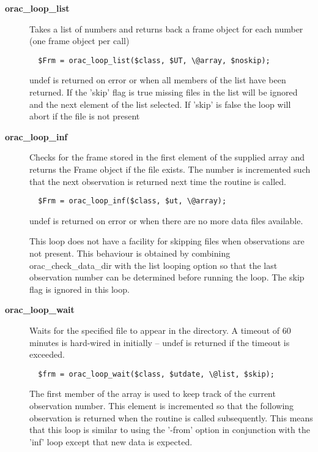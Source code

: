 \begin{description}
\item[\textbf{orac\_loop\_list}] \mbox{}

Takes a list of numbers and returns back a frame object 
for each number (one frame object per call)

\begin{verbatim}
  $Frm = orac_loop_list($class, $UT, \@array, $noskip);
\end{verbatim}


undef is returned on error or when all members of the
list have been returned. If the 'skip' flag is true
missing files in the list will be ignored and the next
element of the list selected. If 'skip' is false
the loop will abort if the file is not present

\item[\textbf{orac\_loop\_inf}] \mbox{}

Checks for the frame stored in the first element of the supplied array
and returns the Frame object if the file exists. The number is incremented
such that the next observation is returned next time the routine is
called.

\begin{verbatim}
  $Frm = orac_loop_inf($class, $ut, \@array);
\end{verbatim}


undef is returned on error or when there are no more data files
available.



This loop does not have a facility for skipping files when observations
are not present. This behaviour is obtained by combining 
orac\_check\_data\_dir with the list looping option so that the last
observation number can be determined before running the loop. The skip
flag is ignored in this loop.

\item[\textbf{orac\_loop\_wait}] \mbox{}

Waits for the specified file to appear in the directory.
A timeout of 60 minutes is hard-wired in initially -- undef
is returned if the timeout is exceeded.

\begin{verbatim}
  $frm = orac_loop_wait($class, $utdate, \@list, $skip);
\end{verbatim}


The first member of the array is used to keep track of the
current observation number. This element is incremented so that
the following observation is returned when the routine is called
subsequently. This means that this loop is similar to using the
'-from' option in conjunction with the 'inf' loop except that
new data is expected.




\end{description}
